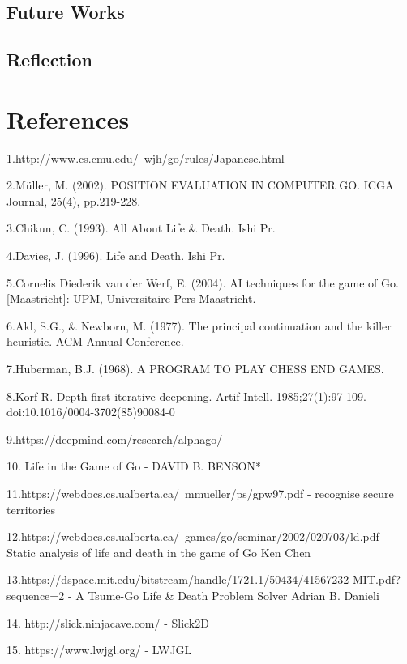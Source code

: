 \documentclass{l4proj}
\begin{document}
\section{Future Works}

\section{Reflection}


\chapter{References}

1.http://www.cs.cmu.edu/~wjh/go/rules/Japanese.html

2.Müller, M. (2002). POSITION EVALUATION IN COMPUTER GO. ICGA Journal, 25(4), pp.219-228.

3.Chikun, C. (1993). All About Life \& Death. Ishi Pr.

4.Davies, J. (1996). Life and Death. Ishi Pr.

5.Cornelis Diederik van der Werf, E. (2004). AI techniques for the game of Go. [Maastricht]: UPM, Universitaire Pers Maastricht.

6.Akl, S.G., \& Newborn, M. (1977). The principal continuation and the killer heuristic. ACM Annual Conference.

7.Huberman, B.J. (1968). A PROGRAM TO PLAY CHESS END GAMES.

8.Korf R. Depth-first iterative-deepening. Artif Intell. 1985;27(1):97-109. doi:10.1016/0004-3702(85)90084-0

9.https://deepmind.com/research/alphago/

10. Life in the Game of Go  - DAVID B. BENSON*

11.https://webdocs.cs.ualberta.ca/~mmueller/ps/gpw97.pdf  - recognise secure territories

12.https://webdocs.cs.ualberta.ca/~games/go/seminar/2002/020703/ld.pdf -  Static analysis of life and death in the game of Go Ken Chen

13.https://dspace.mit.edu/bitstream/handle/1721.1/50434/41567232-MIT.pdf?sequence=2 -
 A Tsume-Go Life \& Death Problem Solver Adrian B. Danieli

 14. http://slick.ninjacave.com/ - Slick2D

 15. https://www.lwjgl.org/ - LWJGL



\end{document}

